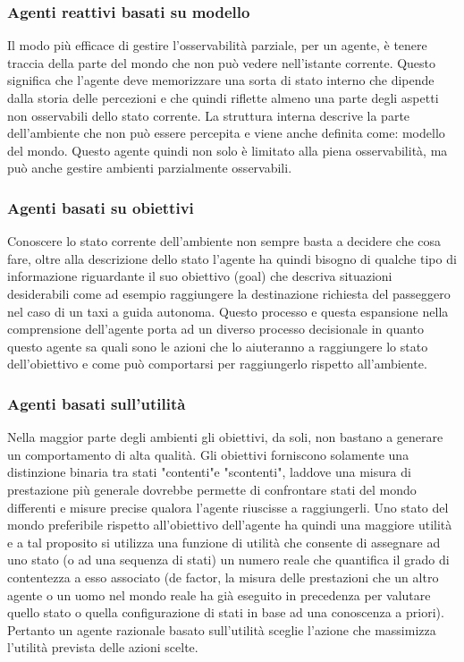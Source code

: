 \subsubsection{Agenti reattivi basati su modello}
Il modo più efficace di gestire l'osservabilità parziale, per un agente, è tenere traccia della parte del mondo che non può vedere nell'istante corrente. Questo significa che l'agente deve memorizzare una sorta di stato interno che dipende dalla storia delle percezioni e che quindi riflette almeno una parte degli aspetti non osservabili dello stato corrente.
La struttura interna descrive la parte dell'ambiente che non può essere percepita e viene anche definita come: modello del mondo. Questo agente quindi non solo è limitato alla piena osservabilità, ma può anche gestire ambienti parzialmente osservabili.

\subsubsection{Agenti basati su obiettivi}
Conoscere lo stato corrente dell'ambiente non sempre basta a decidere che cosa fare, oltre alla descrizione dello stato l'agente ha quindi bisogno di qualche tipo di informazione riguardante il suo obiettivo (goal) che descriva situazioni desiderabili come ad esempio raggiungere la destinazione richiesta del passeggero nel caso di un taxi a guida autonoma.
Questo processo e questa espansione nella comprensione dell'agente porta ad un diverso processo decisionale in quanto questo agente sa quali sono le azioni che lo aiuteranno a raggiungere lo stato dell'obiettivo e come può comportarsi per raggiungerlo rispetto all'ambiente.

\subsubsection{Agenti basati sull'utilità}
Nella maggior parte degli ambienti gli obiettivi, da soli, non bastano a generare un comportamento di alta qualità. Gli obiettivi forniscono solamente una distinzione binaria tra stati "contenti"e "scontenti", laddove una misura di prestazione più generale dovrebbe permette di confrontare stati del mondo differenti e misure precise qualora l'agente riuscisse a raggiungerli. Uno stato del mondo preferibile rispetto all'obiettivo dell'agente ha quindi una maggiore utilità e a tal proposito si utilizza una funzione di utilità che consente di assegnare ad uno stato (o ad una sequenza di stati) un numero reale che quantifica il grado di contentezza a esso associato (de factor, la misura delle prestazioni che un altro agente o un uomo nel mondo reale ha già eseguito in precedenza per valutare quello stato o quella configurazione di stati in base ad una conoscenza a priori).
Pertanto un agente razionale basato sull'utilità sceglie l'azione che massimizza l'utilità prevista delle azioni scelte.

